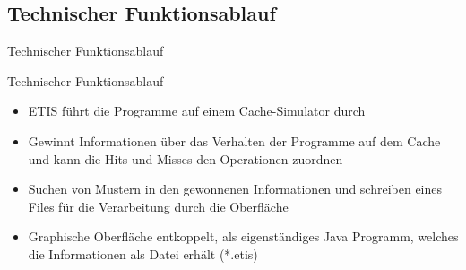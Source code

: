 \subsection{Technischer Funktionsablauf}
\begin{frame}{Technischer Funktionsablauf}
\begin{block}{Technischer Funktionsablauf}
\begin{itemize}[<+->]
\pause\item ETIS führt die Programme auf einem Cache-Simulator durch
\item Gewinnt Informationen über das Verhalten der Programme auf dem Cache und kann die Hits und Misses den Operationen zuordnen
\item Suchen von Mustern in den gewonnenen Informationen und schreiben eines Files für die Verarbeitung durch die Oberfläche
\item Graphische Oberfläche entkoppelt, als eigenständiges Java Programm, welches die Informationen als Datei erhält (*.etis)
\end{itemize}
\end{block}
\end{frame}

